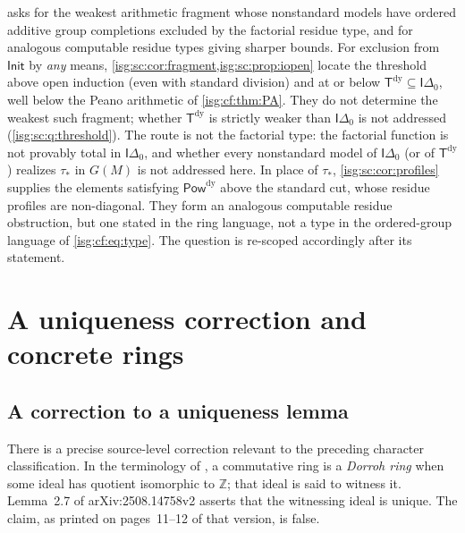 \documentclass[11pt]{article}
\theoremstyle{definition}
\theoremstyle{remark}
\newcommand{\Z}{\mathbb{Z}}
\newcommand{\IR}{\mathsf{Init}}
\newcommand{\PowDy}{\mathsf{Pow}^{\mathrm{dy}}}
\newcommand{\Tdy}{\mathsf{T}^{\mathrm{dy}}}
\newcommand{\Idelta}{\mathsf{I}\Delta_0}
\begin{document}
\begin{remark}\label{isg:sc:rem:fragment}
 asks for the weakest arithmetic fragment whose
nonstandard models have ordered additive group completions excluded by the
factorial residue type, and for analogous computable residue types giving
sharper bounds. For exclusion from $\IR$ by \emph{any} means,
\cref{isg:sc:cor:fragment,isg:sc:prop:iopen} locate the threshold above
open induction (even with standard division) and at or below
$\Tdy\subseteq\Idelta$, well below the Peano arithmetic of
\cref{isg:cf:thm:PA}. They do not determine the weakest such fragment;
whether $\Tdy$ is strictly weaker than $\Idelta$ is not addressed
(\cref{isg:sc:q:threshold}). The route is not the factorial type: the
factorial function is not provably total in $\Idelta$, and whether every
nonstandard model of $\Idelta$ (or of $\Tdy$) realizes $\tau_*$ in $G(M)$
is not addressed here. In place of $\tau_*$, \cref{isg:sc:cor:profiles}
supplies the elements satisfying $\PowDy$ above the standard cut, whose
residue profiles are non-diagonal. They form an analogous computable
residue obstruction, but one stated in the ring language, not a type in
the ordered-group language of \eqref{isg:cf:eq:type}. The question is
re-scoped accordingly after its statement.
\end{remark}

\section{A uniqueness correction and concrete rings}\label{isg:sc:sec:rings}

\subsection{A correction to a uniqueness lemma}\label{isg:sc:sec:correction}
There is a precise source-level correction relevant to the preceding
character classification. In the terminology of
\cite[Section~2.5]{ELV}, a commutative ring is a \emph{Dorroh ring} when
some ideal has quotient isomorphic to $\Z$; that ideal is said to witness
it. Lemma~2.7 of arXiv:2508.14758v2 asserts that the witnessing ideal is
unique. The claim, as printed on pages~11--12 of that version, is false.
\end{document}
